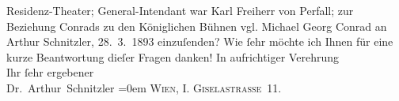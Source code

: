 \begin{ledgroupsized}[t]{13cm}
{{{{                     Residenz-Theater}; General-Intendant war Karl Freiherr von Perfall; zur Beziehung Conrads zu den Königlichen Bühnen vgl. Michael Georg Conrad an Arthur Schnitzler, 28. 3. 1893}}}\label{K_L00009_2h} einzuſenden? Wie ſehr möchte ich Ihnen für eine kurze
               Beantwortung dieſer {\pb}Fragen danken!\pend
           \pstart
           In aufrichtiger Verehrung{\\[\baselineskip]}Ihr ſehr ergebener{\\[\baselineskip]}\spacefill\mbox{Dr. Arthur Schnitzler}\pend
           \leftskip=0em{}\pstart
           \noindent{}\textsc{Wien, I. Giselastraße 11.}\pend
           
         
         \endnumbering{}\end{ledgroupsized}  \newcommand{\dateiname}{L00009}\newcommand{\titel}{Arthur Schnitzler an Michael Georg Conrad, 11. 3. 1891}\newcommand{\editorInnen}{Martin Anton Müller und Gerd-Hermann Susen}
      